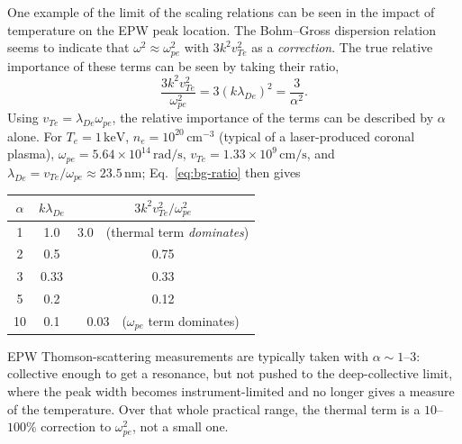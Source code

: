 \documentclass[11pt]{article}
\begin{document}
One example of the limit of the scaling relations can be seen in the impact of temperature on the EPW peak location. The Bohm--Gross dispersion relation seems to indicate that $\omega^2\approx\omega_{pe}^2$ with $3k^2v_{Te}^2$ as a \emph{correction}. The true relative importance of these terms can be seen by  taking their ratio, 
\begin{equation}\label{eq:bg-ratio}
  \frac{3k^2v_{Te}^2}{\omega_{pe}^2} = 3(k\lambda_{De})^2 = \frac{3}{\alpha^2}.
\end{equation}
Using
$v_{Te}=\lambda_{De}\omega_{pe}$, the relative importance of the terms can be described by $\alpha$ alone. For $T_e=1\,\mathrm{keV}$, $n_e=10^{20}\,\mathrm{cm^{-3}}$ (typical of a
laser-produced coronal plasma), $\omega_{pe}=5.64\times10^{14}\,\mathrm{rad/s}$,
$v_{Te}=1.33\times10^9\,\mathrm{cm/s}$, and $\lambda_{De}=v_{Te}/\omega_{pe}\approx23.5\,
\mathrm{nm}$; Eq.~\ref{eq:bg-ratio} then gives
\begin{center}
\begin{tabular}{c c c}
\toprule
$\alpha$ & $k\lambda_{De}$ & $3k^2v_{Te}^2/\omega_{pe}^2$ \\
\midrule
1  & 1.0  & 3.0\ \ (thermal term \emph{dominates}) \\
2  & 0.5  & 0.75 \\
3  & 0.33 & 0.33 \\
5  & 0.2  & 0.12 \\
10 & 0.1  & 0.03\ \ ($\omega_{pe}$ term dominates) \\
\bottomrule
\end{tabular}
\end{center}
EPW Thomson-scattering measurements are typically taken with $\alpha\sim1$--$3$: collective
enough to get a resonance, but not pushed to the deep-collective limit, where the
peak width becomes instrument-limited and no longer gives a measure of the temperature.
Over that whole practical range, the thermal term is a $10$--$100\%$ correction to
$\omega_{pe}^2$, not a small one.
\end{document}
